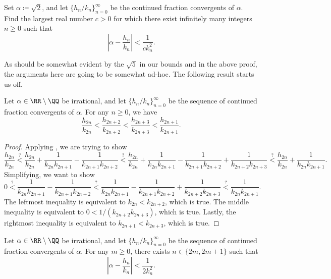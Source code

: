 \documentclass[../notes.tex]{subfiles}
\begin{document}
\begin{exe} \label{exe:sqrr-2-hurwitz}
	Set $\alpha\coloneqq\sqrt2$, and let $\{h_n/k_n\}_{n=0}^\infty$ be the continued fraction convergents of $\alpha$. Find the largest real number $c>0$ for which there exist infinitely many integers $n\ge0$ such that
	\[\left|\alpha-\frac{h_n}{k_n}\right|<\frac1{ck_n^2}.\]
\end{exe}
As should be somewhat evident by the $\sqrt5$ in our bounds and in the above proof, the arguments here are going to be somewhat ad-hoc. The following result starts us off.
\begin{lemma} \label{lem:convergents-alternate}
	Let $\alpha\in\RR\setminus\QQ$ be irrational, and let $\{h_n/k_n\}_{n=0}^\infty$ be the sequence of continued fraction convergents of $\alpha$. For any $n\ge0$, we have
	\[\frac{h_{2n}}{k_{2n}}<\frac{h_{2n+2}}{k_{2n+2}}<\frac{h_{2n+3}}{k_{2n+3}}<\frac{h_{2n+1}}{k_{2n+1}}.\]
\end{lemma}
\begin{proof}
	Applying , we are trying to show
	\[\frac{h_{2n}}{k_{2n}}\stackrel?<\frac{h_{2n}}{k_{2n}}+\frac1{k_{2n}k_{2n+1}}-\frac1{k_{2n+1}k_{2n+2}}\stackrel?<\frac{h_{2n}}{k_{2n}}+\frac1{k_{2n}k_{2n+1}}-\frac1{k_{2n+1}k_{2n+2}}+\frac1{k_{2n+2}k_{2n+3}}\stackrel?<\frac{h_{2n}}{k_{2n}}+\frac1{k_{2n}k_{2n+1}}.\]
	Simplifying, we want to show
	\[0\stackrel?<\frac1{k_{2n}k_{2n+1}}-\frac1{k_{2n+1}k_{2n+2}}\stackrel?<\frac1{k_{2n}k_{2n+1}}-\frac1{k_{2n+1}k_{2n+2}}+\frac1{k_{2n+2}k_{2n+3}}\stackrel?<\frac1{k_{2n}k_{2n+1}}.\]
	The leftmost inequality is equivalent to $k_{2n}<k_{2n+2}$, which is true. The middle inequality is equivalent to $0<1/(k_{2n+2}k_{2n+3})$, which is true. Lastly, the rightmost inequality is equivalent to $k_{2n+1}<k_{2n+3}$, which is true.
\end{proof}
\begin{proposition} \label{prop:every-other-conv}
	Let $\alpha\in\RR\setminus\QQ$ be irrational, and let $\{h_n/k_n\}_{n=0}^\infty$ be the sequence of continued fraction convergents of $\alpha$. For any $m\ge0$, there exists $n\in\{2m,2m+1\}$ such that
	\[\left|\alpha-\frac{h_n}{k_n}\right|<\frac1{2k_n^2}.\]
\end{proposition}
\end{document}
